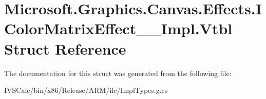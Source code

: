 \hypertarget{struct_microsoft_1_1_graphics_1_1_canvas_1_1_effects_1_1_i_color_matrix_effect_____impl_1_1_vtbl}{}\section{Microsoft.\+Graphics.\+Canvas.\+Effects.\+I\+Color\+Matrix\+Effect\+\_\+\+\_\+\+Impl.\+Vtbl Struct Reference}
\label{struct_microsoft_1_1_graphics_1_1_canvas_1_1_effects_1_1_i_color_matrix_effect_____impl_1_1_vtbl}


The documentation for this struct was generated from the following file\+:\begin{DoxyCompactItemize}
\item 
I\+V\+S\+Calc/bin/x86/\+Release/\+A\+R\+M/ilc/Impl\+Types.\+g.\+cs\end{DoxyCompactItemize}

